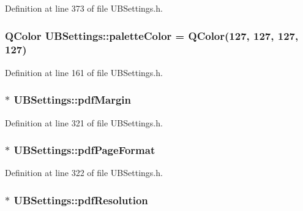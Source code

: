 Definition at line 373 of file U\-B\-Settings.\-h.

\hypertarget{class_u_b_settings_a625a557a8d25f36ff54fa6c7747cee86}{
\subsubsection[{palette\-Color}]{\setlength{\rightskip}{0pt plus 5cm}Q\-Color U\-B\-Settings\-::palette\-Color = Q\-Color(127, 127, 127, 127)\hspace{0.3cm}{\ttfamily [static]}}}\label{db/d66/class_u_b_settings_a625a557a8d25f36ff54fa6c7747cee86}


Definition at line 161 of file U\-B\-Settings.\-h.

\hypertarget{class_u_b_settings_a9b23093384b7e7fc7e51f28aff9191a3}{
\subsubsection[{pdf\-Margin}]{$\ast$ U\-B\-Settings\-::pdf\-Margin}}\label{db/d66/class_u_b_settings_a9b23093384b7e7fc7e51f28aff9191a3}


Definition at line 321 of file U\-B\-Settings.\-h.

\hypertarget{class_u_b_settings_a18512a64aed802118cb7f2f44c4ea8f4}{
\subsubsection[{pdf\-Page\-Format}]{$\ast$ U\-B\-Settings\-::pdf\-Page\-Format}}\label{db/d66/class_u_b_settings_a18512a64aed802118cb7f2f44c4ea8f4}


Definition at line 322 of file U\-B\-Settings.\-h.

\hypertarget{class_u_b_settings_af913238e2c69d4b6bf1bddc9b8d0dd4e}{
\subsubsection[{pdf\-Resolution}]{$\ast$ U\-B\-Settings\-::pdf\-Resolution}}\label{db/d66/class_u_b_settings_af913238e2c69d4b6bf1bddc9b8d0dd4e}


